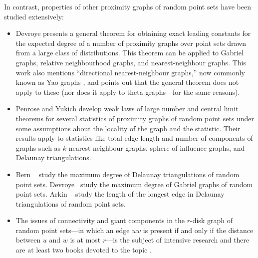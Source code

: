 \documentclass{patmorin}
\begin{document}
In contrast, properties of other proximity graphs of random point
sets have been studied extensively:  
\begin{itemize}
\item Devroye \cite{devroye:expected}
presents a general theorem for obtaining exact leading constants for the
expected degree of a number of proximity graphs over point sets drawn
from a large class of distributions.  This theorem can be applied to
Gabriel graphs, relative neighbourhood graphs, and nearest-neighbour
graphs.  This work \cite[Section~7]{devroye:expected} also mentions
``directional nearest-neighbour graphs,'' now commonly known as Yao graphs
\cite{flinchbaugh.jones:strong,yao:on}, and points out that the general
theorem does not apply to these (nor does it apply to theta graphs---for
the same reasons).

\item 
Penrose and Yukich \cite{penrose.yukich:central,penrose.yukich:weak}
develop weak laws of large number and central limit theorems for several
statistics of proximity graphs of random point sets under some assumptions
about the locality of the graph and the statistic. Their results apply
to statistics like total edge length and number of components of graphs
such as $k$-nearest neighbour graphs, sphere of influence graphs,
and Delaunay triangulations.




\item 
Bern \etal\ \cite{bern.eppstein.ea:expected} study the maximum degree
of Delaunay triangulations of random point sets.  Devroye \etal\ study
the maximum degree of Gabriel graphs \cite{devroye.gudmundsson.ea:on}
of random point sets.  Arkin \etal\ \cite{arkin.anta.ea:probabilistic}
study the length of the longest edge in Delaunay triangulations of random
point sets.

\item 
The issues of connectivity and giant components in the $r$-disk graph
of random point sets---in which an edge $uw$ is present if and only
if the distance between $u$ and $w$ is at most $r$---is the subject of
intensive research and there are at least two books devoted to the topic
\cite{meester.roy:continuum,penrose:random}.
\end{itemize}
\end{document}
